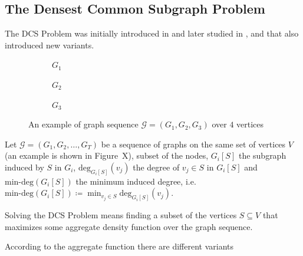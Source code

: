 \subsection{The Densest Common Subgraph Problem}%
\label{sub:the_common_densest_subgraph_problem}

The \acrfull{DCS} Problem was initially introduced in \cite{jethava2015finding}
and later studied in \cite{andersson2016finding}, \cite{charikar2018finding}
and \cite{semertzidis2019finding} that also introduced new variants.

\begin{figure}
	\begin{center}
		\begin{subfigure}[b]{0.3\textwidth}
			\centering
			\caption{$G_1$}
			\label{fig:graph_sequence_example1}
		\end{subfigure}
		\begin{subfigure}[b]{0.3\textwidth}
			\centering
			\caption{$G_2$}
			\label{fig:graph_sequence_example2}
		\end{subfigure}
		\begin{subfigure}[b]{0.3\textwidth}
			\centering
			\caption{$G_3$}
			\label{fig:graph_sequence_example3}
		\end{subfigure}
	\end{center}
	\caption{An example of graph sequence $\mathcal{G} = (G_1, G_2, G_3) $ over $4$ vertices}
	\label{fig:graph_sequence_example}
\end{figure}

Let $\mathcal{G} = (G_1, G_2, \dots, G_T) $ be a sequence of graphs on the same
set of vertices $V$ (an example is shown in Figure~X), %
subset of the nodes, $G_i[S]$ the subgraph induced by $S$ in $G_i$,
$\text{deg}_{G_i[S]} (v_{j} )$ the degree of $v_{j} \in S$ in $G_i[S]$ and
$\text{min-deg}(G_i[S])$ the minimum induced degree, i.e.
$\text{min-deg}(G_i[S]) \coloneqq \min _{v_{j}  \in S} \text{deg} _{G_i[S]}
	(v_{j}) $.

Solving the \acrlong{DCS} Problem means finding a subset
of the vertices $S \subseteq V$ that maximizes some aggregate density function
over the graph sequence.

According to the aggregate function there are different variants

